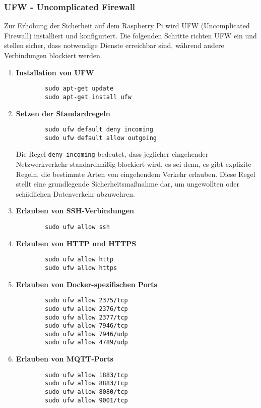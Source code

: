 \subsubsection{UFW - Uncomplicated Firewall}

Zur Erhöhung der Sicherheit auf dem Raspberry Pi wird UFW (Uncomplicated Firewall) installiert und konfiguriert. Die folgenden Schritte richten UFW ein und stellen sicher, dass notwendige Dienste erreichbar sind, während andere Verbindungen blockiert werden.

\begin{enumerate}
	\item \textbf{Installation von UFW}
	\begin{verbatim}
		sudo apt-get update
		sudo apt-get install ufw
	\end{verbatim}
	
	\item \textbf{Setzen der Standardregeln}
	\begin{verbatim}
		sudo ufw default deny incoming
		sudo ufw default allow outgoing
	\end{verbatim}
	Die Regel \texttt{deny incoming} bedeutet, dass jeglicher eingehender Netzwerkverkehr standardmäßig blockiert wird, es sei denn, es gibt explizite Regeln, die bestimmte Arten von eingehendem Verkehr erlauben. Diese Regel stellt eine grundlegende Sicherheitsmaßnahme dar, um ungewollten oder schädlichen Datenverkehr abzuwehren.\\
	
	\item \textbf{Erlauben von SSH-Verbindungen}
	\begin{verbatim}
		sudo ufw allow ssh
	\end{verbatim}
	
	\item \textbf{Erlauben von HTTP und HTTPS}
	\begin{verbatim}
		sudo ufw allow http
		sudo ufw allow https
	\end{verbatim}
	
	\item \textbf{Erlauben von Docker-spezifischen Ports}
	\begin{verbatim}
		sudo ufw allow 2375/tcp
		sudo ufw allow 2376/tcp
		sudo ufw allow 2377/tcp
		sudo ufw allow 7946/tcp
		sudo ufw allow 7946/udp
		sudo ufw allow 4789/udp
	\end{verbatim}
	
	\item \textbf{Erlauben von MQTT-Ports}
	\begin{verbatim}
		sudo ufw allow 1883/tcp
		sudo ufw allow 8883/tcp
		sudo ufw allow 8080/tcp
		sudo ufw allow 9001/tcp
	\end{verbatim}
	

\end{enumerate}
